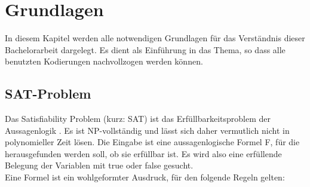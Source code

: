 \documentclass[a4,abstract=on]{scrartcl}
\newcommand*\stdsection{}
\let\stdsection\section
\renewcommand*\section{%
    \clearpage\ifodd\value{page}\else\mbox{}\clearpage\fi
    \stdsection}
\begin{document}
\section{Grundlagen}
In diesem Kapitel werden alle notwendigen Grundlagen für das Verständnis dieser Bachelorarbeit dargelegt. Es dient als Einführung in das Thema, so dass alle benutzten Kodierungen nachvollzogen werden können.
\subsection{SAT-Problem}
Das Satisfiability Problem (kurz: SAT) ist das Erfüllbarkeitsproblem der Aussagenlogik \cite[vgl.][]{sat-problem}. Es ist NP-vollständig und lässt sich daher vermutlich nicht in polynomieller Zeit lösen. Die Eingabe ist eine aussagenlogische Formel F, für die herausgefunden werden soll, ob sie erfüllbar ist. Es wird also eine erfüllende Belegung der Variablen mit true oder false gesucht.\\
Eine Formel ist ein wohlgeformter Ausdruck, für den folgende Regeln gelten:
\end{document}
